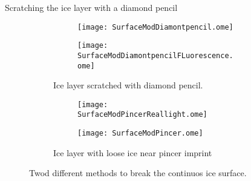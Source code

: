 Scratching the ice layer with a diamond pencil 

\begin{figure}[hbt!]
	\centering
	\begin{subfigure}[]{\textwidth}
		\centering
		\begin{subfigure}[]{0.45\textwidth}
			\centering
			\texttt{[image: SurfaceModDiamontpencil.ome]}
		\end{subfigure}	
		\begin{subfigure}[]{0.45\textwidth}
			\centering
			\texttt{[image: SurfaceModDiamontpencilFLuorescence.ome]}
		\end{subfigure}
		\caption{Ice layer scratched with diamond pencil.\\}
		\label{fig:ScratchedSample}	
	\end{subfigure}
	\begin{subfigure}[]{\textwidth}
		\centering
		\begin{subfigure}[]{0.45\textwidth}
			\centering		
			\texttt{[image: SurfaceModPincerReallight.ome]}	
		\end{subfigure}
		\begin{subfigure}[]{0.45\textwidth}
			\centering
			\texttt{[image: SurfaceModPincer.ome]}	
		\end{subfigure}
		\caption{Ice layer with loose ice near pincer imprint}
		\label{fig:PincerImprint}
	\end{subfigure}
	\caption{Twod different methods to break the continuos ice surface.}
	\label{fig:SurfaceMod}
\end{figure}

\FloatBarrier



